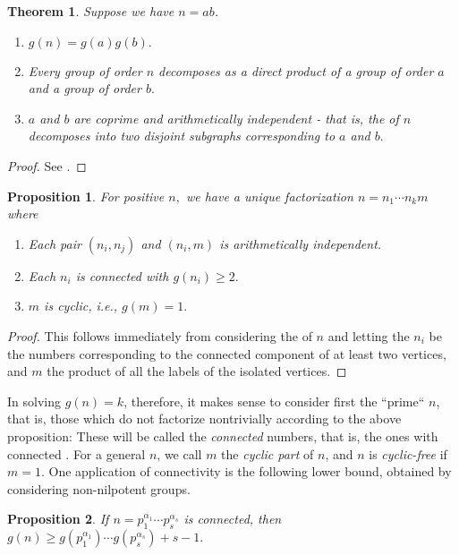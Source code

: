\documentclass[draft]{article}
\newcommand{\ufdsh}{p_1^{\alpha_1} \cdots p_s^{\alpha_s}}
\theoremstyle{plain}
\newtheorem{thm}{Theorem}[section]
\newtheorem{prop}{Proposition}[section]
\theoremstyle{definition}
\begin{document}
\begin{thm}
	Suppose we have $n = ab$.
	\begin{enumerate}\listspace
		\item $g(n) = g(a)g(b).$
		\item Every group of order $n$ decomposes as a direct product of a group of order $a$ and a group of order $b.$
		\item $a$ and $b$ are coprime and arithmetically independent - that is, the \ghg of $n$ decomposes into two disjoint subgraphs corresponding to $a$ and $b.$
	\end{enumerate} \textspace
\end{thm}
\begin{proof}
	See {\cite{monolith}}.
\end{proof}

\begin{prop}
	For positive $n,$ we have a unique factorization $n = n_1 \cdots n_k m$ where\pagebreak[3]
	\begin{enumerate} \listspace
		\item Each pair $(n_i, n_j)$ and $(n_i, m)$ is arithmetically independent.
		\item Each $n_i$ is connected with $g(n_i) \ge 2.$
		\item $m$ is cyclic, i.e., $g(m) = 1.$
	\end{enumerate} \textspace
\end{prop}
\begin{proof}
	This follows immediately from considering the \ghg of $n$ and letting the $n_i$ be the numbers corresponding to the connected component of at least two vertices, and $m$ the product of all the labels of the isolated vertices.
\end{proof}

In solving $g(n) = k$, therefore, it makes sense to consider first the ``prime`` $n$, that is, those which do not factorize nontrivially according to the above proposition: These will be called the \emph{connected} numbers, that is, the ones with connected \ghg. For a general $n$, we call $m$ the \emph{cyclic part} of $n$, and $n$ is \emph{cyclic-free} if $m = 1$. One application of connectivity is the following lower bound, obtained by considering non-nilpotent groups.

\begin{prop}
	If $n = \ufdsh$ is connected, then $g(n) \ge g(p_1^{\alpha_1})\cdots g(p_s^{\alpha_s}) + s - 1.$
\end{prop}
\end{document}
